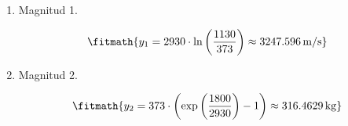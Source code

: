 \begin{enumerate}

\item Magnitud 1.

\[\fitmath{y_{1}=2930\cdot \ln\left(\frac{1130}{373}\right)\approx 3247.596\,\mathrm{m/s}}\]

\item Magnitud 2.

\[\fitmath{y_{2}=373\cdot \left(\exp\left(\frac{1800}{2930}\right)-1\right)\approx 316.4629\,\mathrm{kg}}\]

\end{enumerate}

